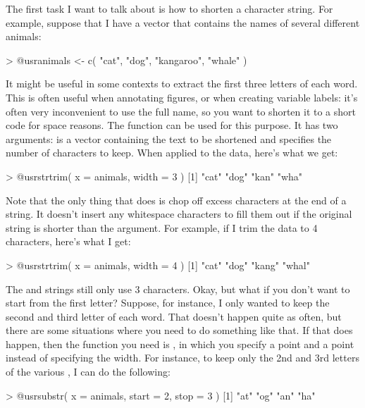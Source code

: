 The first task I want to talk about is how to shorten a character string. For example, suppose that I have a vector that contains the names of several different animals:
\begin{rblock1}
> @usr{animals <- c( "cat", "dog", "kangaroo", "whale" )}
\end{rblock1}
It might be useful in some contexts to extract the first three letters of each word. This is often useful when annotating figures, or when creating variable labels: it's often very inconvenient to use the full name, so you want to shorten it to a short code for space reasons. The  function can be used for this purpose. It has two arguments:  is a vector containing the text to be shortened and  specifies the number of characters to keep. When applied to the  data, here's what we get:
\begin{rblock1}
> @usr{strtrim( x = animals, width = 3 )}
[1] "cat" "dog" "kan" "wha"
\end{rblock1}
Note that the only thing that  does is chop off excess characters at the end of a string. It doesn't insert any whitespace characters to fill them out if the original string is shorter than the  argument. For example, if I trim the  data to 4 characters, here's what I get:
\begin{rblock1}
> @usr{strtrim( x = animals, width = 4 )}
[1] "cat"  "dog"  "kang" "whal"
\end{rblock1}
The  and  strings still only use 3 characters. Okay, but what if you don't want to start from the first letter? Suppose, for instance, I only wanted to keep the second and third letter of each word. That doesn't happen quite as often, but there are some situations where you need to do something like that. If that does happen, then the function you need is , in which you specify a  point and a  point instead of specifying the width. For instance, to keep only the 2nd and 3rd letters of the various , I can do the following:
\begin{rblock1}
> @usr{substr( x = animals, start = 2, stop = 3 )}
[1] "at" "og" "an" "ha"
\end{rblock1}



